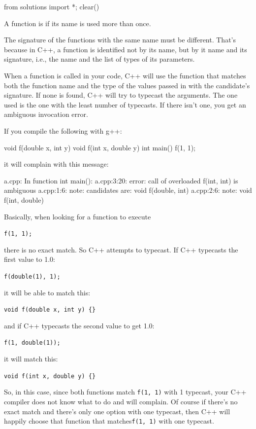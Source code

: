 \begin{python0}
from solutions import *; clear()
\end{python0}

A function is  if its name is used more than once.

The signature of the functions with the same name must be different.
That's because in C++, a function is identified not by
its name, but by it name and its signature, i.e., the name and the list
of types of its parameters.




When a function is called in your code, C++ will use the function that
matches both the function name and the type of the values passed in with
the candidate's signature. If none is found, C++ will try to typecast
the arguments. The one used is the one with the least number of
typecasts. If there isn't one, you get an ambiguous invocation error.



If you compile the following with g++:

\begin{consolethree}[escapeinside=||]
void f(double x, int y) {}
void f(int x, double y) {}
int main() { f(1, 1); }
\end{consolethree}

it will complain with this message:

\begin{consolethree}[escapeinside=||]
a.cpp: In function int main():
a.cpp:3:20: error: call of overloaded f(int, int) is
    ambiguous
a.cpp:1:6: note: candidates are: void f(double, int)
a.cpp:2:6: note: void f(int, double)
\end{consolethree}

Basically, when looking for a function to execute

\texttt{f(1, 1);}

there is no exact match. So C++ attempts to typecast. If C++ typecasts
the first value to 1.0:

\verb!f(double(1), 1);!

it will be able to match this:

\verb!void f(double x, int y) {}!

and if C++ typecasts the second value to get 1.0:

\verb!f(1, double(1));!

it will match this:

\verb!void f(int x, double y) {}!

So, in this case, since both functions match \texttt{f(1, 1)} with 1
typecast, your C++ compiler does not know what to do and will complain.
Of course if there's no exact match and
there's only one option with one typecast, then C++ will
happily choose that function that matches\texttt{f(1, 1)} with one typecast.


